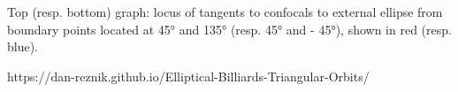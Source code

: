 Top (resp. bottom) graph: locus of tangents to confocals to external ellipse from boundary points located at 45° and 135° (resp. 45° and - 45°), shown in red (resp. blue).

https://dan-reznik.github.io/Elliptical-Billiards-Triangular-Orbits/